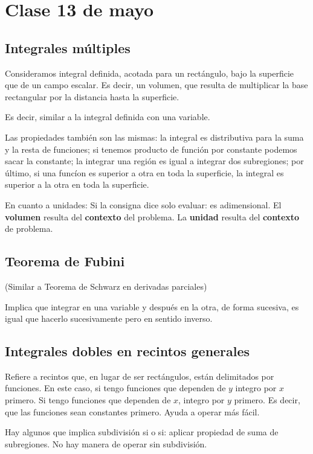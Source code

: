 \section{Clase 13 de mayo}

\subsection{Integrales múltiples}


Consideramos integral definida,
acotada para un rectángulo,
bajo la superficie que de un campo escalar.
Es decir, 
un volumen,
que resulta de multiplicar la base rectangular
por la distancia hasta la superficie.

Es decir,
similar a la integral definida con una variable.

Las propiedades también son las mismas:
la integral es distributiva para la suma y la resta de funciones;
si tenemos producto de función por constante podemos sacar la constante;
la integrar una región es igual a integrar dos subregiones;
por último,
si una funcíon es superior a otra en toda la superficie, 
la integral es superior a la otra en toda la superficie.

En cuanto a unidades:
Si la consigna dice solo evaluar: es adimensional.
El \textbf{volumen} resulta del \textbf{contexto} del problema.
La \textbf{unidad} resulta del \textbf{contexto} de problema.

\subsection{Teorema de Fubini}

(Similar a Teorema de Schwarz en derivadas parciales)

Implica que integrar en una variable y después en la otra,
de forma sucesiva,
es igual que hacerlo sucesivamente pero en sentido inverso.

\subsection{Integrales dobles en recintos generales}

Refiere a recintos que,
en lugar de ser rectángulos,
están delimitados por funciones.
En este caso, si tengo funciones que dependen de \(y\) integro por \(x\) primero.
Si tengo funciones que dependen de \(x\), integro por \(y\) primero.
Es decir, que las funciones sean constantes primero.
Ayuda a operar más fácil.

Hay algunos que implica subdivisión si o si:
aplicar propiedad de suma de subregiones.
No hay manera de operar sin subdivisión.

